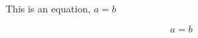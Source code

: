 \documentclass{article}
\begin{document}
This is an equation, $a=b$

\begin{equation}
a=b
\end{equation}
\end{document}
